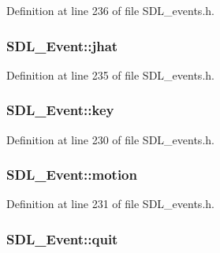 Definition at line 236 of file S\+D\+L\+\_\+events.\+h.

\hypertarget{union_s_d_l___event_a421b40e0f8e01f181c8d5548cff1dd1d}{}
\subsubsection[{jhat}]{ S\+D\+L\+\_\+\+Event\+::jhat}\label{union_s_d_l___event_a421b40e0f8e01f181c8d5548cff1dd1d}


Definition at line 235 of file S\+D\+L\+\_\+events.\+h.

\hypertarget{union_s_d_l___event_ab99927835cc77a9b6bb50b419b4a27df}{}
\subsubsection[{key}]{ S\+D\+L\+\_\+\+Event\+::key}\label{union_s_d_l___event_ab99927835cc77a9b6bb50b419b4a27df}


Definition at line 230 of file S\+D\+L\+\_\+events.\+h.

\hypertarget{union_s_d_l___event_ac3c89e190faacbe84280cd539453bab6}{}
\subsubsection[{motion}]{ S\+D\+L\+\_\+\+Event\+::motion}\label{union_s_d_l___event_ac3c89e190faacbe84280cd539453bab6}


Definition at line 231 of file S\+D\+L\+\_\+events.\+h.

\hypertarget{union_s_d_l___event_a102a3008afe67a1c02ae7504e232dcef}{}
\subsubsection[{quit}]{ S\+D\+L\+\_\+\+Event\+::quit}\label{union_s_d_l___event_a102a3008afe67a1c02ae7504e232dcef}


